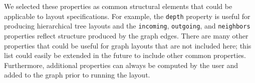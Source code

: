

We selected these properties as common structural elements that could be
applicable to layout specifications. For example, the \texttt{depth}
property is useful for producing hierarchical tree layouts and the 
\texttt{incoming}, \texttt{outgoing}, and \texttt{neighbors} properties
reflect structure produced by the graph edges. There are many other
properties that could be useful for graph layouts that are not included 
here; this list could easily be extended in the future to include other
common properties. Furthermore, additional properties can always be
computed by the user and added to the graph prior to running the layout.